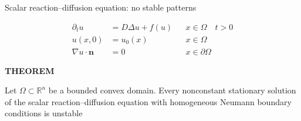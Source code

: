 





\begin{frame}{Scalar reaction--diffusion equation: no stable patterns}


\begin{center}
  \begin{minipage}{0.88\textwidth}

    \vspace{-0.20cm}

    {\color{HydraWhite}\fontsize{9.8}{12.5}\selectfont
    \begin{align*}
      \partial_tu
      &=
      D\Delta u+f(u)
      &&
      x\in\Omega
      \quad
      t>0
      \\
      u(x,0)
      &=
      u_0(x)
      &&
      x\in\Omega
      \\
      \nabla u\cdot\mathbf n
      &=
      0
      &&
      x\in\partial\Omega
    \end{align*}
    }
  \end{minipage}
\end{center}

\vspace{0.58cm}

\begin{center}
  \begin{minipage}{0.88\textwidth}

    {\color{HydraGold}\bfseries\fontsize{9.2}{11}\selectfont
      THEOREM
    \par}

    \vspace{0.14cm}

    {\color{HydraWhite}\fontsize{9}{11.5}\selectfont
      Let $\Omega\subset\mathbb R^n$ be a bounded convex domain.
      Every nonconstant stationary solution of the scalar
      reaction--diffusion equation with homogeneous Neumann
      boundary conditions is unstable
    \par}


\end{minipage}
\end{center}
\end{frame}
